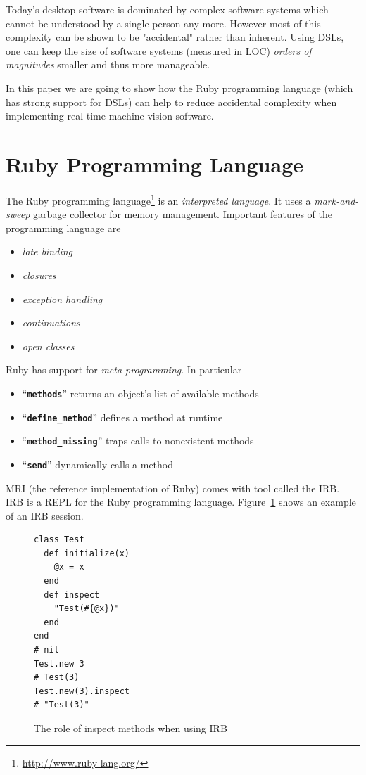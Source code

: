 \documentclass[10pt,journal,compsoc]{joser13}
\newcommand{\code}[1]{``\texttt{\textbf{\textcolor{codegray}{\small{#1}}}}''}
\newcommand{\fig}[1]{Figure~\ref{fig:#1}}
\begin{document}
Today's desktop software is dominated by complex software systems which cannot
be understood by a single person any more. However most of this complexity can
be shown to be "accidental" rather than inherent\citep{ohshima2013kscript}.
Using \acp{DSL}, one can keep the size of software systems (measured in LOC)
\emph{orders of magnitudes} smaller and thus more
manageable\citep{kay2010steps}.

In this paper we are going to show how the Ruby programming language (which has
strong support for DSLs) can help to reduce accidental complexity when
implementing real-time machine vision software.

\section{Ruby Programming Language}
The Ruby programming language\footnote{\url{http://www.ruby-lang.org/}} is an
\emph{interpreted language}. It uses a \emph{mark-and-sweep} garbage collector
for memory management. Important features of the programming language are
\begin{itemize}
  \item \emph{late binding}
  \item \emph{closures}
  \item \emph{exception handling}
  \item \emph{continuations}
  \item \emph{open classes}
\end{itemize}

Ruby has support for \emph{meta-programming}. In particular
\begin{itemize}
  \item \code{methods} returns an object's list of available methods
  \item \code{define\_method} defines a method at runtime
  \item \code{method\_missing} traps calls to nonexistent methods
  \item \code{send} dynamically calls a method
\end{itemize}

\ac{MRI} (the reference implementation of Ruby) comes with tool called the
\ac{IRB}. \ac{IRB} is a \ac{REPL} for the Ruby programming language. \fig{repl}
shows an example of an \ac{IRB} session.

\begin{figure}[htbp]
  \begin{center}
    \begin{minipage}[b]{.8\columnwidth}
      \begin{verbatim}
class Test
  def initialize(x)
    @x = x
  end
  def inspect
    "Test(#{@x})"
  end
end
# nil
Test.new 3
# Test(3)
Test.new(3).inspect
# "Test(3)"
      \end{verbatim}
    \end{minipage}
  \end{center}
  \caption{The role of inspect methods when using IRB\label{fig:repl}}
\end{figure}
\end{document}
